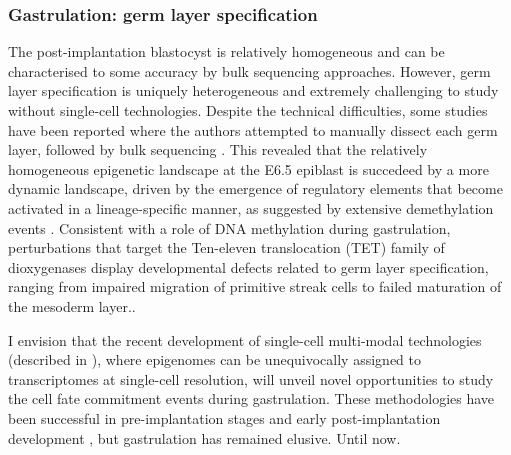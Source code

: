 \subsubsection{Gastrulation: germ layer specification}

The post-implantation blastocyst is relatively homogeneous and can be characterised to some accuracy by bulk sequencing approaches. However, germ layer specification is uniquely heterogeneous and extremely challenging to study without single-cell technologies. Despite the technical difficulties, some studies have been reported where the authors attempted to manually dissect each germ layer, followed by bulk sequencing \cite{Zhang2018}. This revealed that the relatively homogeneous epigenetic landscape at the E6.5 epiblast is succedeed by a more dynamic landscape, driven by the emergence of regulatory elements that become activated in a lineage-specific manner, as suggested by extensive demethylation events \cite{Zhang2018,Lee2015}. Consistent with a role of DNA methylation during gastrulation, perturbations that target the Ten-eleven translocation (TET) family of dioxygenases display developmental defects related to germ layer specification, ranging from impaired migration of primitive streak cells to failed maturation of the mesoderm layer.\cite{Dai2016}.

I envision that the recent development of single-cell multi-modal technologies (described in ), where epigenomes can be unequivocally assigned to transcriptomes at single-cell resolution, will unveil novel opportunities to study the cell fate commitment events during gastrulation. These methodologies have been successful in pre-implantation stages \cite{Guo2017,Wang2019,Liu2019} and early post-implantation development \cite{Rulands2018}, but gastrulation has remained elusive. Until now.

